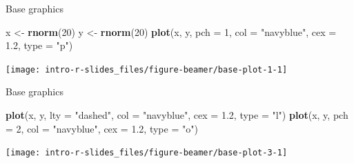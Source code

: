 \documentclass[10pt,ignorenonframetext,compress, aspectratio=169]{beamer}
\newenvironment{Shaded}{\begin{snugshade}}{\end{snugshade}}
\newcommand{\KeywordTok}[1]{\textcolor[rgb]{0.13,0.29,0.53}{\textbf{{#1}}}}
\newcommand{\DataTypeTok}[1]{\textcolor[rgb]{0.13,0.29,0.53}{{#1}}}
\newcommand{\DecValTok}[1]{\textcolor[rgb]{0.00,0.00,0.81}{{#1}}}
\newcommand{\FloatTok}[1]{\textcolor[rgb]{0.00,0.00,0.81}{{#1}}}
\newcommand{\StringTok}[1]{\textcolor[rgb]{0.31,0.60,0.02}{{#1}}}
\newcommand{\NormalTok}[1]{{#1}}
\begin{document}
\begin{frame}[fragile]{Base graphics}

\scriptsize

\begin{Shaded}
\begin{Highlighting}[]
\NormalTok{x <-}\StringTok{ }\KeywordTok{rnorm}\NormalTok{(}\DecValTok{20}\NormalTok{)}
\NormalTok{y <-}\StringTok{ }\KeywordTok{rnorm}\NormalTok{(}\DecValTok{20}\NormalTok{)}
\KeywordTok{plot}\NormalTok{(x, y, }\DataTypeTok{pch =} \DecValTok{1}\NormalTok{, }\DataTypeTok{col =} \StringTok{"navyblue"}\NormalTok{, }\DataTypeTok{cex =} \FloatTok{1.2}\NormalTok{, }\DataTypeTok{type =} \StringTok{"p"}\NormalTok{)}
\end{Highlighting}
\end{Shaded}

\begin{center}\texttt{[image: intro-r-slides\_files/figure-beamer/base-plot-1-1]} \end{center}

\normalsize

\end{frame}

\begin{frame}[fragile]{Base graphics}

\scriptsize

\begin{Shaded}
\begin{Highlighting}[]
\KeywordTok{plot}\NormalTok{(x, y, }\DataTypeTok{lty =} \StringTok{"dashed"}\NormalTok{, }\DataTypeTok{col =} \StringTok{"navyblue"}\NormalTok{, }\DataTypeTok{cex =} \FloatTok{1.2}\NormalTok{, }\DataTypeTok{type =} \StringTok{"l"}\NormalTok{)}
\KeywordTok{plot}\NormalTok{(x, y, }\DataTypeTok{pch =} \DecValTok{2}\NormalTok{, }\DataTypeTok{col =} \StringTok{"navyblue"}\NormalTok{, }\DataTypeTok{cex =} \FloatTok{1.2}\NormalTok{, }\DataTypeTok{type =} \StringTok{"o"}\NormalTok{)}
\end{Highlighting}
\end{Shaded}

\normalsize

\begin{center}\texttt{[image: intro-r-slides\_files/figure-beamer/base-plot-3-1]} \end{center}

\end{frame}
\end{document}
